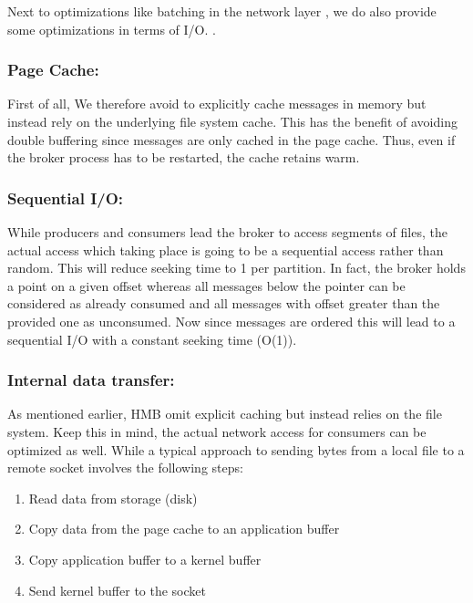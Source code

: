Next to optimizations like batching in the network layer ,
we do also provide some optimizations in terms of I/O. .

\subsubsection{Page Cache:}

First of all, We therefore avoid to explicitly cache messages in memory but
instead rely on the underlying file system cache. This has the benefit of
avoiding double buffering since messages are only cached in the page cache.
Thus, even if the broker process has to be restarted, the cache retains warm.


\subsubsection{Sequential I/O: }

While producers and consumers lead the broker to access
segments of files, the actual access which taking place is going to be a
sequential access rather than random. This will reduce seeking time to 1 per
partition. In fact, the broker holds a point on a given offset whereas all
messages below the pointer can be considered as already consumed and all
messages with offset greater than the provided one as unconsumed. Now since
messages are ordered this will lead to a sequential I/O with a constant seeking
time (O(1)).


\subsubsection{Internal data transfer:}

As mentioned earlier, HMB omit explicit caching but instead relies on the file system.
Keep this in mind, the actual network access for consumers can be optimized as well.
While a typical approach to sending bytes from a local file to a remote
socket involves the following steps: 
\begin{enumerate}
  \item Read data from storage (disk)
  \item Copy data from the page cache to an application buffer
  \item Copy application buffer to a kernel buffer
  \item Send kernel buffer to the socket
\end{enumerate}

